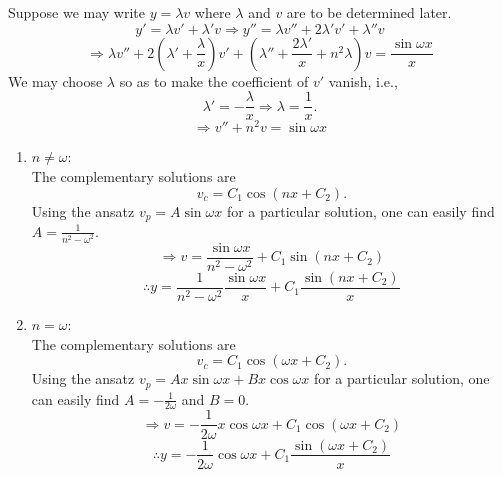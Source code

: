 \item

Suppose we may write $y = \lambda v$ where $\lambda$ and $v$ are to be determined later.
\[
	y' = \lambda v' + \lambda' v
	\Rightarrow y'' = \lambda v'' + 2\lambda' v' + \lambda'' v
\]
\[
	\Rightarrow \lambda v''
	+ 2 \left(\lambda' + \frac{\lambda}{x} \right) v'
	+ \left( \lambda'' + \frac{2\lambda'}{x} + n^2 \lambda \right) v
	= \frac{\sin \omega x}{x}
\]
We may choose $\lambda$ so as to make the coefficient of $v'$ vanish, i.e.,
\[
	\lambda' = -\frac{\lambda}{x}
	\Rightarrow \lambda = \frac{1}{x}.
\]
\[
	\Rightarrow v'' + n^2 v = \sin \omega x
\]

\begin{enumerate}[wide, labelindent = 0pt, label = (\roman*)]
	\item $n \neq \omega$:\\
	The complementary solutions are
	\[
		v_c = C_1 \cos \left( nx + C_2 \right).
	\]
	Using the ansatz $v_p = A \sin \omega x$ for a particular solution, one can easily find $A = \frac{1}{n^2 - \omega^2}$.
	\[
		\Rightarrow v = \frac{\sin \omega x}{n^2 - \omega^2} + C_1 \sin \left( nx + C_2 \right)
	\]
	\[
		\therefore y = \frac{1}{n^2 - \omega^2} \frac{\sin \omega x}{x} + C_1 \frac{\sin \left( nx + C_2 \right)}{x}
	\]

	\item $n = \omega$:\\
	The complementary solutions are
	\[
		v_c = C_1 \cos \left( \omega x + C_2 \right).
	\]
	Using the ansatz $v_p = Ax \sin \omega x + Bx \cos \omega x$ for a particular solution, one can easily find $A = -\frac{1}{2\omega}$ and $B = 0$.
	\[
		\Rightarrow v = -\frac{1}{2\omega} x \cos \omega x + C_1 \cos \left( \omega x + C_2 \right)
	\]
	\[
		\therefore y = -\frac{1}{2\omega} \cos \omega x + C_1 \frac{\sin \left( \omega x + C_2 \right)}{x}
	\]
\end{enumerate}